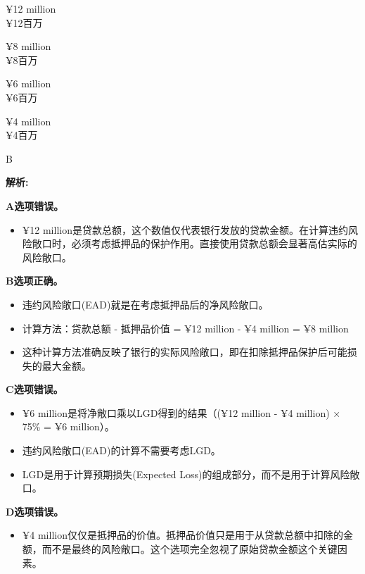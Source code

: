 \documentclass{article}
\newenvironment{explanation}
{\textbf{解析:}\par}
{\par}
\begin{document}
    \begin{choices}
        \item ¥12 million \\
        ¥12百万
        \item ¥8 million \\
        ¥8百万
        \item ¥6 million \\
        ¥6百万
        \item ¥4 million \\
        ¥4百万
    \end{choices}
    
    \begin{correctanswer}
        B
    \end{correctanswer}
    
    \begin{explanation}
        \textbf{A选项错误。}
        \begin{itemize}
            \item ¥12 million是贷款总额，这个数值仅代表银行发放的贷款金额。在计算违约风险敞口时，必须考虑抵押品的保护作用。直接使用贷款总额会显著高估实际的风险敞口。
        \end{itemize}
        
        \textbf{B选项正确。}
        \begin{itemize}
            \item 违约风险敞口(EAD)就是在考虑抵押品后的净风险敞口。
            \item 计算方法：贷款总额 - 抵押品价值 = ¥12 million - ¥4 million = ¥8 million
            \item 这种计算方法准确反映了银行的实际风险敞口，即在扣除抵押品保护后可能损失的最大金额。
        \end{itemize}
    
        \textbf{C选项错误。}
        \begin{itemize}
            \item ¥6 million是将净敞口乘以LGD得到的结果（(¥12 million - ¥4 million) × 75\% = ¥6 million）。
            \item 违约风险敞口(EAD)的计算不需要考虑LGD。
            \item LGD是用于计算预期损失(Expected Loss)的组成部分，而不是用于计算风险敞口。
        \end{itemize}
        
        \textbf{D选项错误。}
        \begin{itemize}
            \item ¥4 million仅仅是抵押品的价值。抵押品价值只是用于从贷款总额中扣除的金额，而不是最终的风险敞口。这个选项完全忽视了原始贷款金额这个关键因素。
        \end{itemize}
    \end{explanation}
\end{document}

